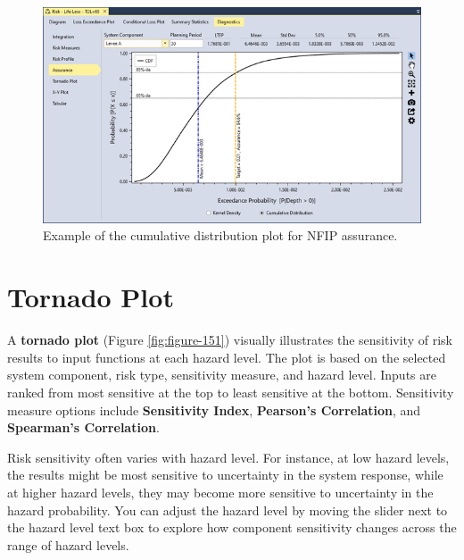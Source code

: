 \documentclass[
]{book}
\begin{document}
\begin{figure}

{\centering \includegraphics{images/figure150} 

}

\caption{Example of the cumulative distribution plot for NFIP assurance.}\label{fig:figure-150}
\end{figure}

\hypertarget{tornado-plot}{%
\section{Tornado Plot}\label{tornado-plot}}

A \textbf{tornado plot} (Figure \ref{fig:figure-151}) visually illustrates the sensitivity of risk results to input functions at each hazard level. The plot is based on the selected system component, risk type, sensitivity measure, and hazard level. Inputs are ranked from most sensitive at the top to least sensitive at the bottom. Sensitivity measure options include \textbf{Sensitivity Index}, \textbf{Pearson's Correlation}, and \textbf{Spearman's Correlation}.

Risk sensitivity often varies with hazard level. For instance, at low hazard levels, the results might be most sensitive to uncertainty in the system response, while at higher hazard levels, they may become more sensitive to uncertainty in the hazard probability. You can adjust the hazard level by moving the slider next to the hazard level text box to explore how component sensitivity changes across the range of hazard levels.
\end{document}
